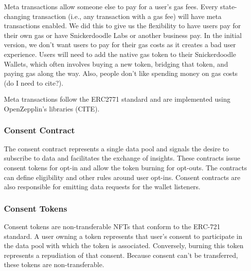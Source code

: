 


Meta transactions allow someone else to pay for a user's gas fees. Every state-changing transaction (i.e., any transaction with a gas fee) will have meta transactions enabled. We did this to give us the flexibility to have users pay for their own gas or have Snickerdoodle Labs or another business pay. In the initial version, we don't want users to pay for their gas costs as it creates a bad user experience. Users will need to add the native gas token to their Snickerdoodle Wallets, which often involves buying a new token, bridging that token, and paying gas along the way. Also, people don't like spending money on gas costs (do I need to cite?). 

Meta transactions follow the ERC2771 standard and are implemented using OpenZepplin's libraries (CITE).


\subsubsection{Consent Contract}
\label{section:ConsentContract}
The consent contract represents a single data pool and signals the desire to subscribe to data and facilitates the exchange of insights. These contracts issue consent tokens for opt-in and allow the token burning for opt-outs. The contracts can define eligibility and other rules around user opt-ins. Consent contracts are also responsible for emitting data requests for the wallet listeners.



\subsubsection{Consent Tokens}
Consent tokens are non-transferable NFTs that conform to the ERC-721 standard. A user owning a token represents that user's consent to participate in the data pool with which the token is associated. Conversely, burning this token represents a repudiation of that consent. Because consent can't be transferred, these tokens are non-transferable.

